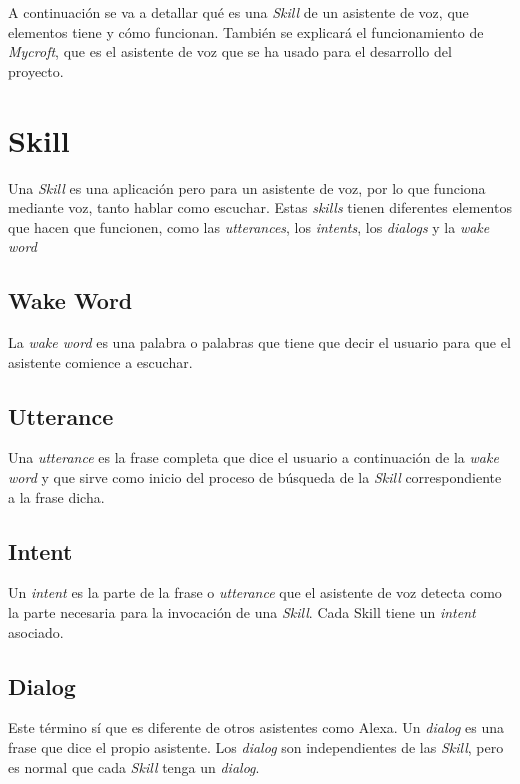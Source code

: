 
A continuación se va a detallar qué es una \textit{Skill} de un asistente de voz, que elementos tiene y cómo funcionan. También se explicará el funcionamiento de \textit{Mycroft}, que es el asistente de voz que se ha usado para el desarrollo del proyecto.

\section{Skill}

Una \textit{Skill} es una aplicación pero para un asistente de voz, por lo que funciona mediante voz, tanto hablar como escuchar. Estas \textit{skills} tienen diferentes elementos que hacen que funcionen, como las \textit{utterances}, los \textit{intents}, los \textit{dialogs} y la \textit{wake word}

\subsection{Wake Word}

La \textit{wake word} es una palabra o palabras que tiene que decir el usuario para que el asistente comience a escuchar.

\subsection{Utterance}

Una \textit{utterance} es la frase completa que dice el usuario a continuación de la \textit{wake word} y que sirve como inicio del proceso de búsqueda de la \textit{Skill} correspondiente a la frase dicha.

\subsection{Intent}

Un \textit{intent} es la parte de la frase o \textit{utterance} que el asistente de voz detecta como la parte necesaria para la invocación de una \textit{Skill}. Cada Skill tiene un \textit{intent} asociado.

\subsection{Dialog}

Este término sí que es diferente de otros asistentes como Alexa. Un \textit{dialog} es una frase que dice el propio asistente. Los \textit{dialog} son independientes de las \textit{Skill}, pero es normal que cada \textit{Skill} tenga un \textit{dialog}.

